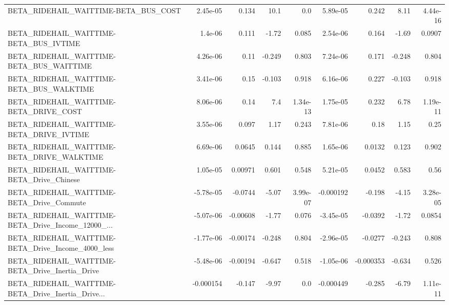 \begin{tabular}{lrrrrrrrr}
BETA\_RIDEHAIL\_WAITTIME-BETA\_BUS\_COST               &    2.45e-05 &        0.134 &     10.1 &      0.0 &   5.89e-05 &       0.242 &         8.11 &      4.44e-16 \\
BETA\_RIDEHAIL\_WAITTIME-BETA\_BUS\_IVTIME             &     1.4e-06 &        0.111 &    -1.72 &    0.085 &   2.54e-06 &       0.164 &        -1.69 &        0.0907 \\
BETA\_RIDEHAIL\_WAITTIME-BETA\_BUS\_WAITTIME           &    4.26e-06 &         0.11 &   -0.249 &    0.803 &   7.24e-06 &       0.171 &       -0.248 &         0.804 \\
BETA\_RIDEHAIL\_WAITTIME-BETA\_BUS\_WALKTIME           &    3.41e-06 &         0.15 &   -0.103 &    0.918 &   6.16e-06 &       0.227 &       -0.103 &         0.918 \\
BETA\_RIDEHAIL\_WAITTIME-BETA\_DRIVE\_COST             &    8.06e-06 &         0.14 &      7.4 & 1.34e-13 &   1.75e-05 &       0.232 &         6.78 &      1.19e-11 \\
BETA\_RIDEHAIL\_WAITTIME-BETA\_DRIVE\_IVTIME           &    3.55e-06 &        0.097 &     1.17 &    0.243 &   7.81e-06 &        0.18 &         1.15 &          0.25 \\
BETA\_RIDEHAIL\_WAITTIME-BETA\_DRIVE\_WALKTIME         &    6.69e-06 &       0.0645 &    0.144 &    0.885 &   1.65e-06 &      0.0132 &        0.123 &         0.902 \\
BETA\_RIDEHAIL\_WAITTIME-BETA\_Drive\_Chinese          &    1.05e-05 &      0.00971 &    0.601 &    0.548 &   5.21e-05 &      0.0452 &        0.583 &          0.56 \\
BETA\_RIDEHAIL\_WAITTIME-BETA\_Drive\_Commute          &   -5.78e-05 &      -0.0744 &    -5.07 & 3.99e-07 &  -0.000192 &      -0.198 &        -4.15 &      3.28e-05 \\
BETA\_RIDEHAIL\_WAITTIME-BETA\_Drive\_Income\_12000\_... &   -5.07e-06 &     -0.00608 &    -1.77 &    0.076 &  -3.45e-05 &     -0.0392 &        -1.72 &        0.0854 \\
BETA\_RIDEHAIL\_WAITTIME-BETA\_Drive\_Income\_4000\_less &   -1.77e-06 &     -0.00174 &   -0.248 &    0.804 &  -2.96e-05 &     -0.0277 &       -0.243 &         0.808 \\
BETA\_RIDEHAIL\_WAITTIME-BETA\_Drive\_Inertia\_Drive    &   -5.48e-06 &     -0.00194 &   -0.647 &    0.518 &  -1.05e-06 &   -0.000353 &       -0.634 &         0.526 \\
BETA\_RIDEHAIL\_WAITTIME-BETA\_Drive\_Inertia\_Drive... &   -0.000154 &       -0.147 &    -9.97 &      0.0 &  -0.000449 &      -0.285 &        -6.79 &      1.11e-11 \\

\end{tabular}
